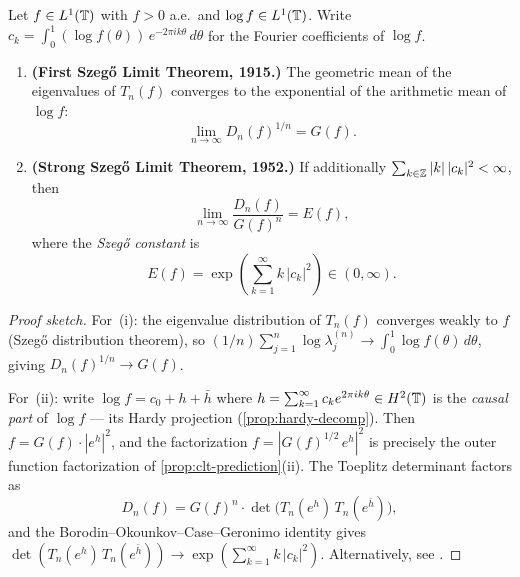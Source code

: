 \begin{theorem}\label{thm:szego}
Let $f \in L^1(\mathbb{T})$ with $f > 0$ a.e.\ and $\log f \in L^1(\mathbb{T})$. Write $c_k = \int_0^1 (\log f(\theta))\, e^{-2\pi i k\theta}\, d\theta$ for the Fourier coefficients of $\log f$.
\begin{enumerate}[label=(\roman*)]
\item \textbf{(First Szeg\H{o} Limit Theorem, 1915.)} The geometric mean of the eigenvalues of $T_n(f)$ converges to the exponential of the arithmetic mean of $\log f$:
\begin{equation}\label{eq:szego-first}
\lim_{n \to \infty} D_n(f)^{1/n} = G(f).
\end{equation}

\item \textbf{(Strong Szeg\H{o} Limit Theorem, 1952.)} If additionally $\sum_{k \in \mathbb{Z}} |k|\, |c_k|^2 < \infty$, then
\begin{equation}\label{eq:szego-strong}
\lim_{n \to \infty} \frac{D_n(f)}{G(f)^n} = E(f),
\end{equation}
where the \emph{Szeg\H{o} constant} is
\begin{equation}\label{eq:szego-constant}
E(f) = \exp\!\left(\sum_{k=1}^{\infty} k\, |c_k|^2\right) \in (0, \infty).
\end{equation}
\end{enumerate}
\end{theorem}

\begin{proof}[Proof sketch]
For~(i): the eigenvalue distribution of $T_n(f)$ converges weakly to $f$ (Szeg\H{o} distribution theorem), so $(1/n)\sum_{j=1}^n \log \lambda_j^{(n)} \to \int_0^1 \log f(\theta)\, d\theta$, giving $D_n(f)^{1/n} \to G(f)$.

For~(ii): write $\log f = c_0 + h + \bar{h}$ where $h = \sum_{k=1}^{\infty} c_k e^{2\pi i k \theta} \in H^2(\mathbb{T})$ is the \emph{causal part} of $\log f$ --- its Hardy projection (\cref{prop:hardy-decomp}). Then $f = G(f) \cdot |e^h|^2$, and the factorization $f = |G(f)^{1/2}\, e^h|^2$ is precisely the outer function factorization of \cref{prop:clt-prediction}(ii). The Toeplitz determinant factors as
\[
D_n(f) = G(f)^n \cdot \det\bigl(T_n(e^h)\, T_n(e^{\bar{h}})\bigr),
\]
and the Borodin--Okounkov--Case--Geronimo identity \cite[Chapter~5]{BottcherSilbermann} gives $\det(T_n(e^h)\, T_n(e^{\bar{h}})) \to \exp(\sum_{k=1}^{\infty} k\, |c_k|^2)$. Alternatively, see \cite[Chapter~2]{Simon}.
\end{proof}

